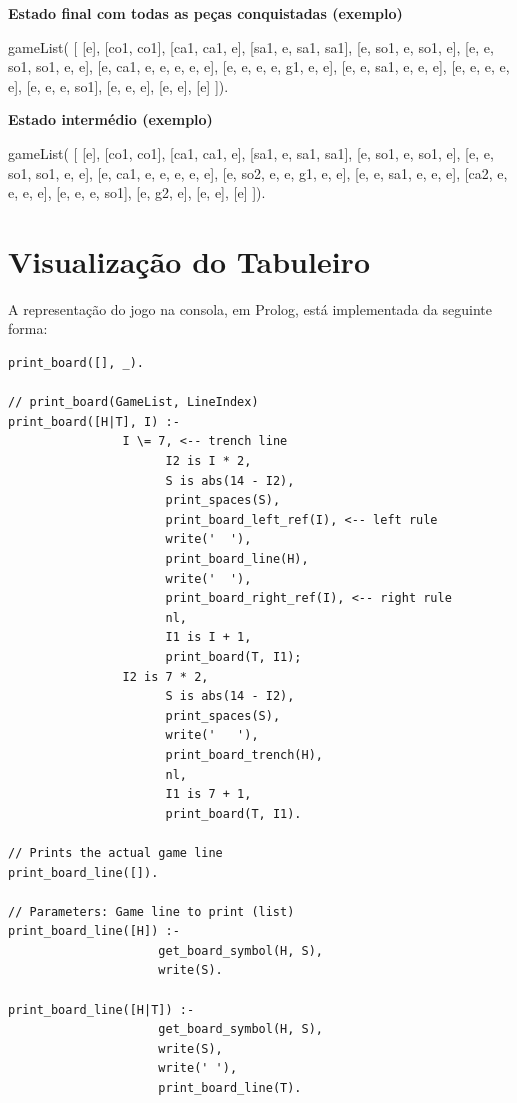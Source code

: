 \vspace{1cm}

\textbf{Estado final com todas as peças conquistadas (exemplo)}

gameList( [ [e],
    [co1, co1],
    [ca1, ca1, e],
    [sa1, e, sa1, sa1],
    [e, so1, e, so1, e],
    [e, e, so1, so1, e, e],
    [e, ca1, e, e, e, e, e],
    [e, e, e, e, g1, e, e],
    [e, e, sa1, e, e, e],
    [e, e, e, e, e],
    [e, e, e, so1],
    [e, e, e],
    [e, e],
     [e]  ]).

\vspace{1cm}

\textbf{Estado intermédio (exemplo)}

gameList( [ [e],
    [co1, co1],
    [ca1, ca1, e],
    [sa1, e, sa1, sa1],
    [e, so1, e, so1, e],
    [e, e, so1, so1, e, e],
    [e, ca1, e, e, e, e, e],
    [e, so2, e, e, g1, e, e],
    [e, e, sa1, e, e, e],
    [ca2, e, e, e, e],
    [e, e, e, so1],
    [e, g2, e],
    [e, e],
     [e]  ]).


\newpage

\section{Visualização do Tabuleiro}

A representação do jogo na consola, em Prolog, está implementada da seguinte forma:

\begin{lstlisting}
print_board([], _).

// print_board(GameList, LineIndex)
print_board([H|T], I) :-
                I \= 7, <-- trench line
                      I2 is I * 2,
                      S is abs(14 - I2),
                      print_spaces(S),
                      print_board_left_ref(I), <-- left rule
                      write('  '),
                      print_board_line(H),
                      write('  '),
                      print_board_right_ref(I), <-- right rule
                      nl,
                      I1 is I + 1,
                      print_board(T, I1);
                I2 is 7 * 2,
                      S is abs(14 - I2),
                      print_spaces(S),
                      write('   '),
                      print_board_trench(H),
                      nl,
                      I1 is 7 + 1,
                      print_board(T, I1).

// Prints the actual game line
print_board_line([]).

// Parameters: Game line to print (list)
print_board_line([H]) :-
                     get_board_symbol(H, S),
                     write(S).

print_board_line([H|T]) :-
                     get_board_symbol(H, S),
                     write(S),
                     write(' '),
                     print_board_line(T).

\end{lstlisting}

